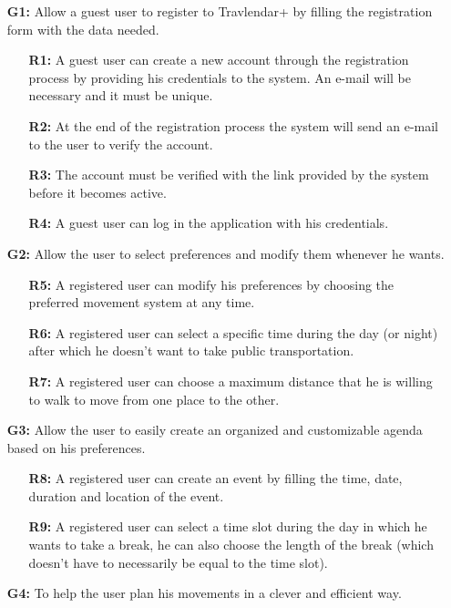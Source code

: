 \documentclass{article}
\begin{document}
\begin{enumerate}
\item[\textbf{G1:}] Allow a guest user to register to Travlendar+ by filling the registration form with the data needed.
\begin{enumerate}
\item[\textbf{R1:}] A guest user can create a new account through the registration process by providing his credentials to the system. An e-mail will be necessary and it must be unique.
\item[\textbf{R2:}] At the end of the registration process the system will send an e-mail to the user to verify the account.
\item[\textbf{R3:}] The account must be verified with the link provided by the system before it becomes active.
\item[\textbf{R4:}] A guest user can log in the application with his credentials.
\end{enumerate}
\item[\textbf{G2:}] Allow the user to select preferences and modify them whenever he wants.
\begin{enumerate}
\item[\textbf{R5:}] A registered user can modify his preferences by choosing the preferred movement system at any time.
\item[\textbf{R6:}] A registered user can select a specific time during the day (or night) after which he doesn't want to take public transportation.
\item[\textbf{R7:}] A registered user can choose a maximum distance that he is willing to walk to move from one place to the other.
\end{enumerate}
\item[\textbf{G3:}] Allow the user to easily create an organized and customizable agenda based on his preferences.
\begin{enumerate}
\item[\textbf{R8:}] A registered user can create an event by filling the time, date, duration and location of the event.
\item[\textbf{R9:}] A registered user can select a time slot during the day in which he wants to take a break, he can also choose the length of the break (which doesn't have to necessarily be equal to the time slot).
\end{enumerate}
\item[\textbf{G4:}] To help the user plan his movements in a clever and efficient way.
\begin{enumerate}

\end{enumerate}
\end{enumerate}
\end{document}

